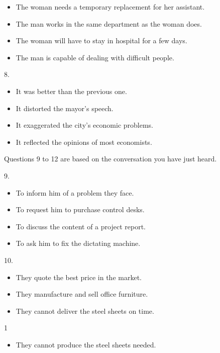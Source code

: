 \documentclass[UTF8,11pt]{ctexart}
\begin{document}
\begin{itemize}[leftmargin=2em,itemsep=.2em,topsep=.4em]\item[A.] The woman needs a temporary replacement for her assistant.
\item[B.] The man works in the same department as the woman does.
\item[C.] The woman will have to stay in hospital for a few days.
\item[D.] The man is capable of dealing with difficult people.
\end{itemize}

8.


\begin{itemize}[leftmargin=2em,itemsep=.2em,topsep=.4em]\item[A.] It was better than the previous one.
\item[B.] It distorted the mayor’s speech.
\item[C.] It exaggerated the city’s economic problems.
\item[D.] It reflected the opinions of most economists.
\end{itemize}

Questions 9 to 12 are based on the conversation you have just heard.


9.


\begin{itemize}[leftmargin=2em,itemsep=.2em,topsep=.4em]\item[A.] To inform him of a problem they face.
\item[B.] To request him to purchase control desks.
\item[C.] To discuss the content of a project report.
\item[D.] To ask him to fix the dictating machine.
\end{itemize}

10.


\begin{itemize}[leftmargin=2em,itemsep=.2em,topsep=.4em]\item[A.] They quote the best price in the market.
\item[B.] They manufacture and sell office furniture.
\item[C.] They cannot deliver the steel sheets on time.
\end{itemize}

1


\begin{itemize}[leftmargin=2em,itemsep=.2em,topsep=.4em]\item[D.] They cannot produce the steel sheets needed.
\end{itemize}
\end{document}
